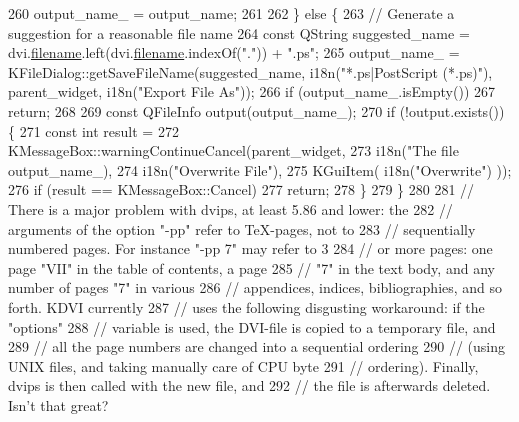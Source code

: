 \begin{DoxyCode}
260     output\_name\_ = output\_name;
261 
262   \} \textcolor{keywordflow}{else} \{
263     \textcolor{comment}{// Generate a suggestion for a reasonable file name}
264     \textcolor{keyword}{const} QString suggested\_name = dvi.\hyperlink{classdvifile_a1c0fe420231e71f256b5db367b7e1178}{filename}.left(dvi.\hyperlink{classdvifile_a1c0fe420231e71f256b5db367b7e1178}{filename}.indexOf(\textcolor{stringliteral}{"."})) + \textcolor{stringliteral}{".ps"};
265     output\_name\_ = KFileDialog::getSaveFileName(suggested\_name, i18n(\textcolor{stringliteral}{"*.ps|PostScript (*.ps)"}), 
      parent\_widget, i18n(\textcolor{stringliteral}{"Export File As"}));
266     \textcolor{keywordflow}{if} (output\_name\_.isEmpty())
267       \textcolor{keywordflow}{return};
268 
269     \textcolor{keyword}{const} QFileInfo output(output\_name\_);
270     \textcolor{keywordflow}{if} (!output.exists()) \{
271       \textcolor{keyword}{const} \textcolor{keywordtype}{int} result =
272         KMessageBox::warningContinueCancel(parent\_widget,
273                                            i18n(\textcolor{stringliteral}{"The file %
      output\_name\_),
274                                            i18n(\textcolor{stringliteral}{"Overwrite File"}),
275                                            KGuiItem( i18n(\textcolor{stringliteral}{"Overwrite"}) ));
276       \textcolor{keywordflow}{if} (result == KMessageBox::Cancel)
277         \textcolor{keywordflow}{return};
278     \}
279   \}
280 
281   \textcolor{comment}{// There is a major problem with dvips, at least 5.86 and lower: the}
282   \textcolor{comment}{// arguments of the option "-pp" refer to TeX-pages, not to}
283   \textcolor{comment}{// sequentially numbered pages. For instance "-pp 7" may refer to 3}
284   \textcolor{comment}{// or more pages: one page "VII" in the table of contents, a page}
285   \textcolor{comment}{// "7" in the text body, and any number of pages "7" in various}
286   \textcolor{comment}{// appendices, indices, bibliographies, and so forth. KDVI currently}
287   \textcolor{comment}{// uses the following disgusting workaround: if the "options"}
288   \textcolor{comment}{// variable is used, the DVI-file is copied to a temporary file, and}
289   \textcolor{comment}{// all the page numbers are changed into a sequential ordering}
290   \textcolor{comment}{// (using UNIX files, and taking manually care of CPU byte}
291   \textcolor{comment}{// ordering). Finally, dvips is then called with the new file, and}
292   \textcolor{comment}{// the file is afterwards deleted. Isn't that great?}
}
\end{DoxyCode}
